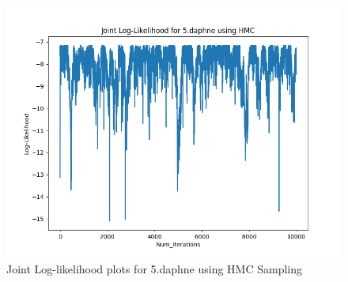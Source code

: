 \documentclass{article}
\begin{document}
\begin{enumerate}
\begin{enumerate}
\begin{figure}[!ht]
	\centering
	\includegraphics[scale=0.5]{../figs/HMC/joint_log_likelihood_5_daphne}
	 \caption{Joint Log-likelihood plots for 5.daphne using HMC Sampling}
\end{figure}
\end{enumerate}
\end{enumerate}
\end{document}
